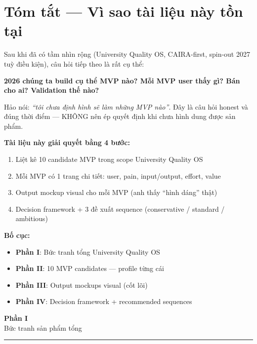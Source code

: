 \documentclass[11pt,a4paper]{article}
\begin{document}
\section*{Tóm tắt — Vì sao tài liệu này tồn tại}

Sau khi đã có tầm nhìn rộng (University Quality OS, CAIRA-first, spin-out 2027
tuỳ điều kiện), câu hỏi tiếp theo là rất cụ thể:

\begin{keybox}[title=Câu hỏi cần trả lời]
\textbf{2026 chúng ta build cụ thể MVP nào? Mỗi MVP user thấy gì? Bán cho ai?
Validation thế nào?}
\end{keybox}

Hảo nói: \textit{``tôi chưa định hình sẽ làm những MVP nào''}. Đây là câu hỏi
honest và đúng thời điểm --- KHÔNG nên ép quyết định khi chưa hình dung được
sản phẩm.

\textbf{Tài liệu này giải quyết bằng 4 bước:}
\begin{enumerate}
\item Liệt kê 10 candidate MVP trong scope University Quality OS
\item Mỗi MVP có 1 trang chi tiết: user, pain, input/output, effort, value
\item Output mockup visual cho mỗi MVP (anh thấy ``hình dáng'' thật)
\item Decision framework + 3 đề xuất sequence (conservative / standard / ambitious)
\end{enumerate}

\textbf{Bố cục:}
\begin{itemize}
\item \textbf{Phần I}: Bức tranh tổng University Quality OS
\item \textbf{Phần II}: 10 MVP candidates --- profile từng cái
\item \textbf{Phần III}: Output mockups visual (cốt lõi)
\item \textbf{Phần IV}: Decision framework + recommended sequences
\end{itemize}

\clearpage

\begin{center}
\vspace*{0.5em}
{\sffamily\bfseries\Huge\color{ink} Phần I}\\[0.5em]
{\sffamily\LARGE\color{mid} Bức tranh sản phẩm tổng}\\[0.5em]
{\color{ink}\rule{6cm}{0.4pt}}
\end{center}
\vspace{1em}
\end{document}

